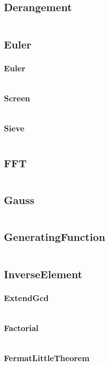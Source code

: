 \documentclass[a4paper,11pt]{article}
\begin{document}
\subsection{Derangement}
\inputminted[breaklines]{c++}{Math/+Derangement.cpp}
\subsection{Euler}
\subsubsection{Euler}
\inputminted[breaklines]{c++}{Math/+Euler/+Euler.cpp}
\subsubsection{Screen}
\inputminted[breaklines]{c++}{Math/+Euler/+Screen.cpp}
\subsubsection{Sieve}
\inputminted[breaklines]{c++}{Math/+Euler/+Sieve.cpp}

\subsection{FFT}
\inputminted[breaklines]{c++}{Math/+FFT.cpp}
\subsection{Gauss}
\inputminted[breaklines]{c++}{Math/+Gauss.cpp}
\subsection{GeneratingFunction}
\inputminted[breaklines]{c++}{Math/+GeneratingFunction.cpp}
\subsection{InverseElement}
\subsubsection{ExtendGcd}
\inputminted[breaklines]{c++}{Math/+InverseElement/+ExtendGcd.cpp}
\subsubsection{Factorial}
\inputminted[breaklines]{c++}{Math/+InverseElement/+Factorial.cpp}
\subsubsection{FermatLittleTheorem}
\inputminted[breaklines]{c++}{Math/+InverseElement/+FermatLittleTheorem.cpp}
\end{document}

